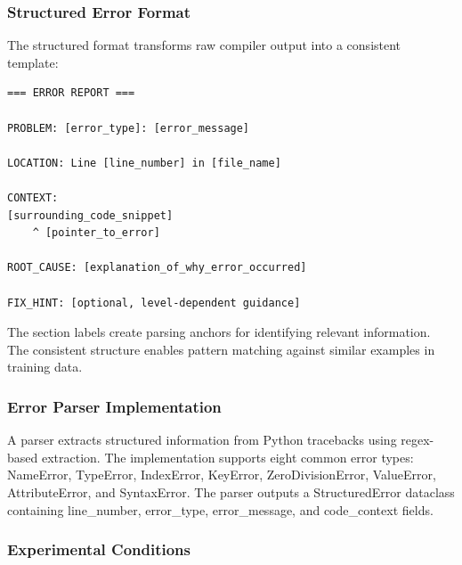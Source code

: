 
\subsubsection{Structured Error Format}

The structured format transforms raw compiler output into a consistent template:

\begin{verbatim}
=== ERROR REPORT ===

PROBLEM: [error_type]: [error_message]

LOCATION: Line [line_number] in [file_name]

CONTEXT:
[surrounding_code_snippet]
    ^ [pointer_to_error]

ROOT_CAUSE: [explanation_of_why_error_occurred]

FIX_HINT: [optional, level-dependent guidance]
\end{verbatim}

The section labels create parsing anchors for identifying relevant information. The consistent structure enables pattern matching against similar examples in training data.

\subsubsection{Error Parser Implementation}

A parser extracts structured information from Python tracebacks using regex-based extraction. The implementation supports eight common error types: NameError, TypeError, IndexError, KeyError, ZeroDivisionError, ValueError, AttributeError, and SyntaxError. The parser outputs a StructuredError dataclass containing line\_number, error\_type, error\_message, and code\_context fields.

\subsubsection{Experimental Conditions}

\begin{table}[htbp]
\centering
{}
\end{table}


